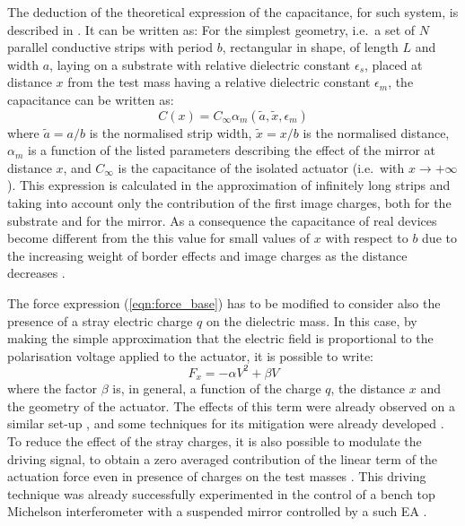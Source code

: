The deduction of the theoretical expression of the capacitance, for such system, is described in \cite{Grasso}. It can be written as:
For the simplest geometry, i.e.\ a set of $N$ parallel conductive strips with period $b$, rectangular in shape, of length $L$ and width $a$, laying on a substrate with relative dielectric constant $\epsilon_{s}$, placed at distance $x$ from the test mass having a relative dielectric constant $\epsilon_{m}$, the capacitance can be written as:
\begin{equation}
\label{eqn:c_exp}
C(x)=C_\infty \alpha_m\left(\tilde{a},\tilde{x},\epsilon_m\right)
\end{equation}
where $\tilde{a}=a/b$ is the normalised strip width, $\tilde{x}=x/b$ is the normalised distance, $\alpha_m$ is a function of the listed parameters describing the effect of the mirror at distance $x$, and $C_\infty$ is the capacitance of the isolated actuator (i.e.\ with $x\rightarrow+\infty$).
This expression is calculated in the approximation of infinitely long strips and taking into account only the contribution of the first image charges, both for the substrate and for the mirror. As a consequence the capacitance of real devices become different from the this value for small values of $x$ with respect to $b$ due to the increasing weight of border effects and image charges as the distance decreases \cite{Grasso}. 

The force expression (\ref{eqn:force_base}) has to be modified to consider also the presence of a stray electric charge $q$ on the dielectric mass. In this case, by making the simple approximation that the electric field is proportional to the polarisation voltage applied to the actuator, it is possible to write:
\begin{equation}
\label{eqn:total_force}
F_x = -\alpha V^2 +\beta V
\end{equation}
where the factor $\beta$ is, in general, a function of the charge $q$, the distance $x$ and the geometry of the actuator.
The effects of this term were already observed on a similar set-up \cite{Mortonson}, and some techniques for its mitigation were already developed \cite{GeoCharge}. To reduce the effect of the stray charges, it is also possible to modulate the driving signal, to obtain a zero averaged contribution of the linear term of the  actuation force even in presence of charges on the test masses \cite{ElDrive}. This driving technique was already successfully experimented in the control of a bench top Michelson interferometer with a suspended mirror controlled by a such EA \cite{ElAct}.

